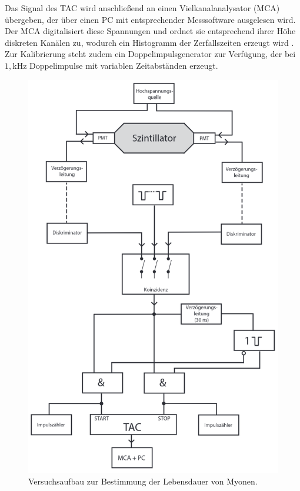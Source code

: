 Das Signal des TAC wird anschließend an einen Vielkanalanalysator (MCA) übergeben, der über einen PC mit entsprechender Messsoftware ausgelesen wird. Der MCA digitalisiert diese Spannungen und 
ordnet sie entsprechend ihrer Höhe diskreten Kanälen zu, wodurch ein Histogramm der Zerfallszeiten erzeugt wird \cite{Teilchendetektoren}. Zur Kalibrierung steht zudem ein Doppelimpulsgenerator zur Verfügung, 
der bei $1,\unit{\kilo\hertz}$ Doppelimpulse mit variablen Zeitabständen erzeugt.
\begin{figure}[H]
    \centering
    \includegraphics[width = 0.6\linewidth]{bilder/AufbauV01.png}
    \caption{Versuchsaufbau zur Bestimmung der Lebensdauer von Myonen. \cite{anleitungV01}}
    \label{AufbauV01}
\end{figure}
